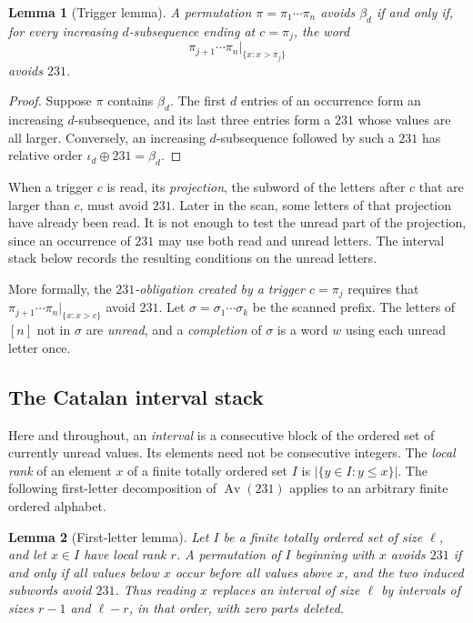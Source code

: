 \documentclass[11pt,reqno]{amsart}
\newtheorem{lemma}[lemma]{Lemma}
\theoremstyle{definition}
\theoremstyle{remark}
\newcommand{\Av}{\operatorname{Av}}
\begin{document}
\begin{lemma}[Trigger lemma]\label{lem:trigger}
A permutation $\pi=\pi_1\cdots\pi_n$ avoids $\beta_d$ if and only if, for
every increasing $d$-subsequence ending at $c=\pi_j$, the word
\[
  \pi_{j+1}\cdots\pi_n\big|_{\{x:x>\pi_j\}}
\]
avoids $231$.
\end{lemma}

\begin{proof}
Suppose $\pi$ contains $\beta_d$.  The first $d$ entries of an occurrence
form an increasing $d$-subsequence, and its last three entries form a $231$ whose values are all
larger.  Conversely, an increasing $d$-subsequence followed by such a $231$
has relative order $\iota_d\oplus231=\beta_d$.
\end{proof}

When a trigger $c$ is read, its \emph{projection}, the subword of the
letters after $c$ that are larger than $c$, must avoid $231$.  Later in the scan, some letters of that projection have already been
read.  It is not enough to test the unread part of the projection, since an
occurrence of $231$ may use both read and unread letters.  The interval stack
below records the resulting conditions on the unread letters.

More formally, the \emph{$231$-obligation created by a trigger $c=\pi_j$}
requires that
\(
 \pi_{j+1}\cdots\pi_n|_{\{x:x>c\}}
\)
avoid $231$.  Let $\sigma=\sigma_1\cdots\sigma_k$ be
the scanned prefix.  The letters of $[n]$ not in $\sigma$ are \emph{unread},
and a \emph{completion} of $\sigma$ is a word $w$ using each unread letter
once.

\subsection{The Catalan interval stack}\label{sec:stack}

Here and throughout, an \emph{interval} is a consecutive block of the
ordered set of currently unread values.  Its elements need not be
consecutive integers.  The \emph{local rank} of an element $x$ of a finite
totally ordered set $I$ is $|\{y\in I:y\leq x\}|$.  The following
first-letter decomposition of $\Av(231)$ applies to an arbitrary finite
ordered alphabet.

\begin{lemma}[First-letter lemma]\label{lem:first-letter}
Let $I$ be a finite totally ordered set of size $\ell$, and let $x\in I$ have
local rank $r$.  A permutation of $I$ beginning with
$x$ avoids $231$ if and only if
all values below $x$ occur before all values above $x$, and the two induced
subwords avoid $231$.  Thus reading $x$ replaces an interval of size $\ell$
by intervals of sizes $r-1$ and $\ell-r$, in that order, with zero parts
deleted.
\end{lemma}
\end{document}
